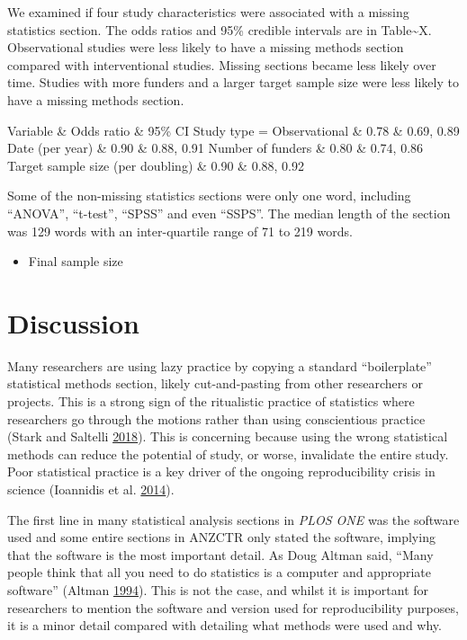 \documentclass[
]{article}
\providecommand{\tightlist}{%
  \setlength{\itemsep}{0pt}\setlength{\parskip}{0pt}}
\begin{document}
We examined if four study characteristics were associated with a missing
statistics section. The odds ratios and 95\% credible intervals are in
Table\textasciitilde X. Observational studies were less likely to have a
missing methods section compared with interventional studies. Missing
sections became less likely over time. Studies with more funders and a
larger target sample size were less likely to have a missing methods
section.

Variable \& Odds ratio \& 95\% CI Study type = Observational \& 0.78 \&
0.69, 0.89 Date (per year) \& 0.90 \& 0.88, 0.91 Number of funders \&
0.80 \& 0.74, 0.86 Target sample size (per doubling) \& 0.90 \& 0.88,
0.92

Some of the non-missing statistics sections were only one word,
including ``ANOVA'', ``t-test'', ``SPSS'' and even ``SSPS''. The median
length of the section was 129 words with an inter-quartile range of 71
to 219 words.

\begin{itemize}
\tightlist
\item
  Final sample size
\end{itemize}

\hypertarget{discussion}{%
\section{Discussion}\label{discussion}}

Many researchers are using lazy practice by copying a standard
``boilerplate'' statistical methods section, likely cut-and-pasting from
other researchers or projects. This is a strong sign of the ritualistic
practice of statistics where researchers go through the motions rather
than using conscientious practice (Stark and Saltelli
\protect\hyperlink{ref-Stark2018}{2018}). This is concerning because
using the wrong statistical methods can reduce the potential of study,
or worse, invalidate the entire study. Poor statistical practice is a
key driver of the ongoing reproducibility crisis in science (Ioannidis
et al. \protect\hyperlink{ref-Ioannidis2014}{2014}).

The first line in many statistical analysis sections in \emph{PLOS ONE}
was the software used and some entire sections in ANZCTR only stated the
software, implying that the software is the most important detail. As
Doug Altman said, ``Many people think that all you need to do statistics
is a computer and appropriate software'' (Altman
\protect\hyperlink{ref-Altman1994}{1994}). This is not the case, and
whilst it is important for researchers to mention the software and
version used for reproducibility purposes, it is a minor detail compared
with detailing what methods were used and why.
\end{document}
